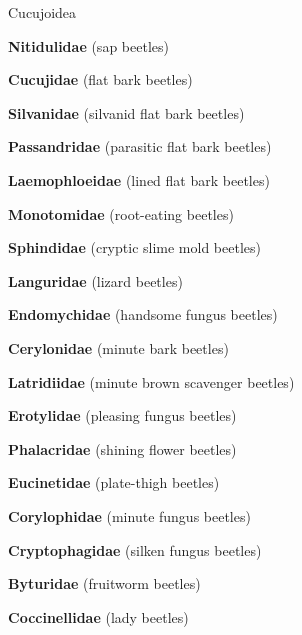 \documentclass[letterpaper,10pt]{article}
\begin{document}
{\makebox[0.40cm]{}  Cucujoidea \par
\makebox[0.6cm]{}  \textbf{Nitidulidae} (sap beetles) \par
\makebox[0.6cm]{}  \textbf{Cucujidae} (flat bark beetles) \par
\makebox[0.6cm]{}  \textbf{Silvanidae} (silvanid flat bark beetles) \par
\makebox[0.6cm]{}  \textbf{Passandridae} (parasitic flat bark beetles) \par
\makebox[0.6cm]{}  \textbf{Laemophloeidae} (lined flat bark beetles) \par
\makebox[0.6cm]{}  \textbf{Monotomidae} (root-eating beetles) \par
\makebox[0.6cm]{}  \textbf{Sphindidae} (cryptic slime mold beetles) \par
\makebox[0.6cm]{}  \textbf{Languridae} (lizard beetles) \par
\makebox[0.6cm]{}  \textbf{Endomychidae} (handsome fungus beetles) \par
\makebox[0.6cm]{}  \textbf{Cerylonidae} (minute bark beetles) \par
\makebox[0.6cm]{}  \textbf{Latridiidae} (minute brown scavenger beetles) \par
\makebox[0.6cm]{}  \textbf{Erotylidae} (pleasing fungus beetles) \par
\makebox[0.6cm]{}  \textbf{Phalacridae} (shining flower beetles) \par
\makebox[0.6cm]{}  \textbf{Eucinetidae} (plate-thigh beetles) \par
\makebox[0.6cm]{}  \textbf{Corylophidae} (minute fungus beetles) \par
\makebox[0.6cm]{}  \textbf{Cryptophagidae} (silken fungus beetles) \par
\makebox[0.6cm]{}  \textbf{Byturidae} (fruitworm beetles) \par
\makebox[0.6cm]{}  \textbf{Coccinellidae} (lady beetles) \par
}
\end{document}
